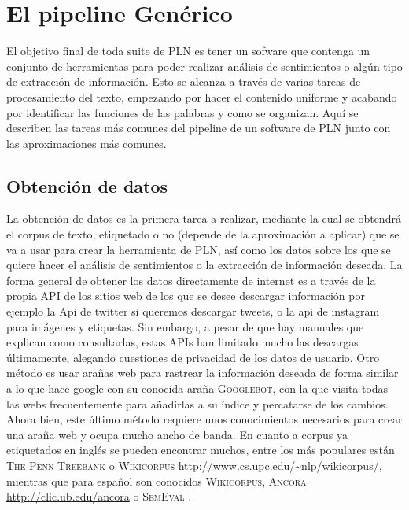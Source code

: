 \section{El pipeline Genérico}
El objetivo final de toda suite de PLN es tener un sofware que contenga un conjunto de herramientas para poder realizar análisis de sentimientos o algún tipo de extracción de información. Esto se alcanza a través de varias tareas de procesamiento del texto, empezando por hacer el contenido uniforme y acabando por identificar las funciones de las palabras y como se organizan. Aquí se describen las tareas más comunes del pipeline de un software de PLN junto con las aproximaciones más comunes. \newline
\subsection{Obtención de datos}
La obtención de datos es la primera tarea a realizar, mediante la cual se obtendrá el corpus de texto, etiquetado o no (depende de la aproximación a aplicar) que se va a usar para crear la herramienta de PLN, así como los datos sobre los que se quiere hacer el análisis de sentimientos o la extracción de información deseada. \newline
La forma general de obtener los datos directamente de internet es a través de la propia API de los sitios web de los que se desee descargar información por ejemplo la Api de twitter si queremos descargar tweets, o la api de instagram para imágenes y etiquetas. Sin embargo, a pesar de que hay manuales que explican como consultarlas, estas APIs  han limitado mucho las descargas últimamente, alegando cuestiones de privacidad de los datos de usuario. Otro método es usar arañas web para rastrear la información deseada de forma similar a lo que hace google con su conocida araña \textsc{Googlebot}, con la que visita todas las webs frecuentemente para añadirlas a su índice y percatarse de los cambios. Ahora bien, este último método requiere unos conocimientos necesarios para crear una araña web y ocupa mucho ancho de banda. \newline
En cuanto a corpus ya etiquetados en inglés se pueden encontrar muchos, entre los más populares están \textsc{The Penn Treebank} \citet{marcus1993building} o \textsc{Wikicorpus} \url{http://www.cs.upc.edu/~nlp/wikicorpus/}, mientras que para español son conocidos \textsc{Wikicorpus}, \textsc{Ancora} \url{http://clic.ub.edu/ancora} o \textsc{SemEval} \citet{marquez2007semeval}. 
    
